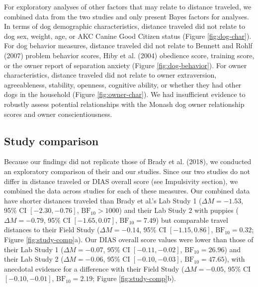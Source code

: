 \documentclass[
  pub,floatsintext]{apa6}
\begin{document}
For exploratory analyses of other factors that may relate to distance traveled, we combined data from the two studies and only present Bayes factors for analyses. In terms of dog demographic characteristics, distance traveled did not relate to dog sex, weight, age, or AKC Canine Good Citizen status (Figure \ref{fig:dog-char}). For dog behavior measures, distance traveled did not relate to Bennett and Rohlf (2007) problem behavior scores, Hiby et al. (2004) obedience score, training score, or the owner report of separation anxiety (Figure \ref{fig:dog-behavior}). For owner characteristics, distance traveled did not relate to owner extraversion, agreeableness, stability, openness, cognitive ability, or whether they had other dogs in the household (Figure \ref{fig:owner-char}). We had insufficient evidence to robustly assess potential relationships with the Monash dog owner relationship scores and owner conscientiousness.

\hypertarget{study-comparison}{%
\subsection{Study comparison}\label{study-comparison}}

Because our findings did not replicate those of Brady et al. (2018), we conducted an exploratory comparison of their and our studies. Since our two studies do not differ in distance traveled or DIAS overall score (see Impulsivity section), we combined the data across studies for each of these measures. Our combined data have shorter distances traveled than Brady et al.'s Lab Study 1 (\(\Delta M = -1.53\), 95\% CI \([-2.30, -0.76]\), \(\mathrm{BF}_{\textrm{10}} > 1000\)) and their Lab Study 2 with puppies (\(\Delta M = -0.79\), 95\% CI \([-1.65, 0.07]\), \(\mathrm{BF}_{\textrm{10}} = 7.49\)) but comparable travel distances to their Field Study (\(\Delta M = -0.14\), 95\% CI \([-1.15, 0.86]\), \(\mathrm{BF}_{\textrm{10}} = 0.32\); Figure \ref{fig:study-comp}a). Our DIAS overall score values were lower than those of their Lab Study 1 (\(\Delta M = -0.07\), 95\% CI \([-0.11, -0.02]\), \(\mathrm{BF}_{\textrm{10}} = 26.96\)) and their Lab Study 2 (\(\Delta M = -0.06\), 95\% CI \([-0.10, -0.03]\), \(\mathrm{BF}_{\textrm{10}} = 47.65\)), with anecdotal evidence for a difference with their Field Study (\(\Delta M = -0.05\), 95\% CI \([-0.10, -0.01]\), \(\mathrm{BF}_{\textrm{10}} = 2.19\); Figure \ref{fig:study-comp}b).
\end{document}
